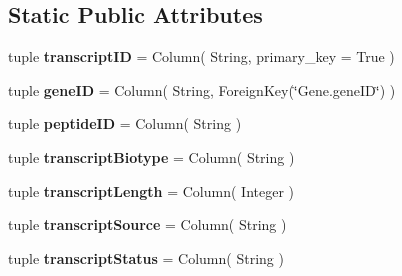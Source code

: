 \subsection*{Static Public Attributes}
\begin{DoxyCompactItemize}
\item 
\hypertarget{classsrc_1_1fr_1_1tagc_1_1rainet_1_1core_1_1data_1_1RNA_1_1RNA_a984ae0249264aeff9234c1253793c56b}{tuple {\bfseries transcript\-I\-D} = Column( String, primary\-\_\-key = True )}\label{classsrc_1_1fr_1_1tagc_1_1rainet_1_1core_1_1data_1_1RNA_1_1RNA_a984ae0249264aeff9234c1253793c56b}

\item 
\hypertarget{classsrc_1_1fr_1_1tagc_1_1rainet_1_1core_1_1data_1_1RNA_1_1RNA_a0de8db39f1a97345d725f25efc09e41a}{tuple {\bfseries gene\-I\-D} = Column( String, Foreign\-Key(\char`\"{}Gene.\-gene\-I\-D\char`\"{}) )}\label{classsrc_1_1fr_1_1tagc_1_1rainet_1_1core_1_1data_1_1RNA_1_1RNA_a0de8db39f1a97345d725f25efc09e41a}

\item 
\hypertarget{classsrc_1_1fr_1_1tagc_1_1rainet_1_1core_1_1data_1_1RNA_1_1RNA_a9b86d64c233ad4448bd9ad8d1e5f9cf9}{tuple {\bfseries peptide\-I\-D} = Column( String )}\label{classsrc_1_1fr_1_1tagc_1_1rainet_1_1core_1_1data_1_1RNA_1_1RNA_a9b86d64c233ad4448bd9ad8d1e5f9cf9}

\item 
\hypertarget{classsrc_1_1fr_1_1tagc_1_1rainet_1_1core_1_1data_1_1RNA_1_1RNA_aa432077878cf0f199a78a0acb248a8c3}{tuple {\bfseries transcript\-Biotype} = Column( String )}\label{classsrc_1_1fr_1_1tagc_1_1rainet_1_1core_1_1data_1_1RNA_1_1RNA_aa432077878cf0f199a78a0acb248a8c3}

\item 
\hypertarget{classsrc_1_1fr_1_1tagc_1_1rainet_1_1core_1_1data_1_1RNA_1_1RNA_add3f15141d2c6f1fbf522a7b37201b65}{tuple {\bfseries transcript\-Length} = Column( Integer )}\label{classsrc_1_1fr_1_1tagc_1_1rainet_1_1core_1_1data_1_1RNA_1_1RNA_add3f15141d2c6f1fbf522a7b37201b65}

\item 
\hypertarget{classsrc_1_1fr_1_1tagc_1_1rainet_1_1core_1_1data_1_1RNA_1_1RNA_aa9d24d0f49759a6d1c9b0905f33dbaf3}{tuple {\bfseries transcript\-Source} = Column( String )}\label{classsrc_1_1fr_1_1tagc_1_1rainet_1_1core_1_1data_1_1RNA_1_1RNA_aa9d24d0f49759a6d1c9b0905f33dbaf3}

\item 
\hypertarget{classsrc_1_1fr_1_1tagc_1_1rainet_1_1core_1_1data_1_1RNA_1_1RNA_ae509a57fdcaf2d1b582496ae95426208}{tuple {\bfseries transcript\-Status} = Column( String )}\label{classsrc_1_1fr_1_1tagc_1_1rainet_1_1core_1_1data_1_1RNA_1_1RNA_ae509a57fdcaf2d1b582496ae95426208}


\end{DoxyCompactItemize}
